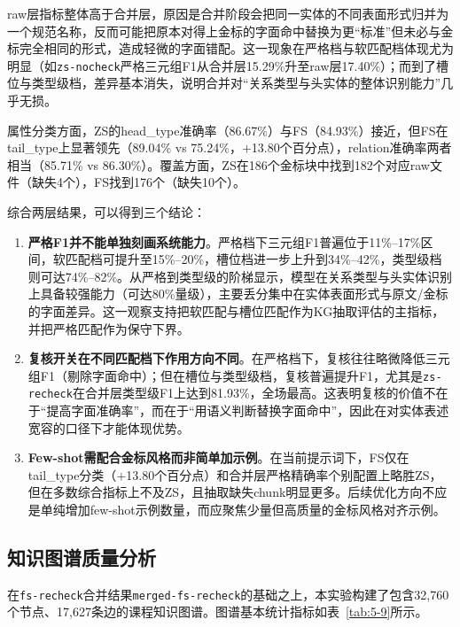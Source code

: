 raw层指标整体高于合并层，原因是合并阶段会把同一实体的不同表面形式归并为一个规范名称，反而可能把原本对得上金标的字面命中替换为更“标准”但未必与金标完全相同的形式，造成轻微的字面错配。这一现象在严格档与软匹配档体现尤为明显（如\texttt{zs-nocheck}严格三元组F1从合并层15.29\%升至raw层17.40\%）；而到了槽位与类型级档，差异基本消失，说明合并对“关系类型与头实体的整体识别能力”几乎无损。

属性分类方面，ZS的head\_type准确率（86.67\%）与FS（84.93\%）接近，但FS在tail\_type上显著领先（89.04\% vs 75.24\%，$+$13.80个百分点），relation准确率两者相当（85.71\% vs 86.30\%）。覆盖方面，ZS在186个金标块中找到182个对应raw文件（缺失4个），FS找到176个（缺失10个）。

综合两层结果，可以得到三个结论：

\begin{enumerate}
    \item \textbf{严格F1并不能单独刻画系统能力}。严格档下三元组F1普遍位于11\%--17\%区间，软匹配档可提升至15\%--20\%，槽位档进一步上升到34\%--42\%，类型级档则可达74\%--82\%。从严格到类型级的阶梯显示，模型在关系类型与头实体识别上具备较强能力（可达80\%量级），主要丢分集中在实体表面形式与原文/金标的字面差异。这一观察支持把软匹配与槽位匹配作为KG抽取评估的主指标，并把严格匹配作为保守下界。
    \item \textbf{复核开关在不同匹配档下作用方向不同}。在严格档下，复核往往略微降低三元组F1（剔除字面命中）；但在槽位与类型级档，复核普遍提升F1，尤其是\texttt{zs-recheck}在合并层类型级F1上达到81.93\%，全场最高。这表明复核的价值不在于“提高字面准确率”，而在于“用语义判断替换字面命中”，因此在对实体表述宽容的口径下才能体现优势。
    \item \textbf{Few-shot需配合金标风格而非简单加示例}。在当前提示词下，FS仅在tail\_type分类（$+$13.80个百分点）和合并层严格精确率个别配置上略胜ZS，但在多数综合指标上不及ZS，且抽取缺失chunk明显更多。后续优化方向不应是单纯增加few-shot示例数量，而应聚焦少量但高质量的金标风格对齐示例。
\end{enumerate}


\subsection{知识图谱质量分析}

在\texttt{fs-recheck}合并结果\texttt{merged-fs-recheck}的基础之上，本实验构建了包含32,760个节点、17,627条边的课程知识图谱。图谱基本统计指标如表~\ref{tab:5-9}所示。

